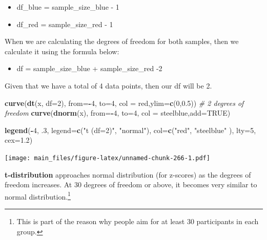 \documentclass[
]{book}
\newenvironment{Shaded}{\begin{snugshade}}{\end{snugshade}}
\newcommand{\AttributeTok}[1]{\textcolor[rgb]{0.13,0.29,0.53}{#1}}
\newcommand{\CommentTok}[1]{\textcolor[rgb]{0.56,0.35,0.01}{\textit{#1}}}
\newcommand{\ConstantTok}[1]{\textcolor[rgb]{0.56,0.35,0.01}{#1}}
\newcommand{\DecValTok}[1]{\textcolor[rgb]{0.00,0.00,0.81}{#1}}
\newcommand{\FloatTok}[1]{\textcolor[rgb]{0.00,0.00,0.81}{#1}}
\newcommand{\FunctionTok}[1]{\textcolor[rgb]{0.13,0.29,0.53}{\textbf{#1}}}
\newcommand{\NormalTok}[1]{#1}
\newcommand{\SpecialCharTok}[1]{\textcolor[rgb]{0.81,0.36,0.00}{\textbf{#1}}}
\newcommand{\StringTok}[1]{\textcolor[rgb]{0.31,0.60,0.02}{#1}}
\providecommand{\tightlist}{%
  \setlength{\itemsep}{0pt}\setlength{\parskip}{0pt}}
\begin{document}
\begin{itemize}
\tightlist
\item
  df\_blue = sample\_size\_blue - 1
\item
  df\_red = sample\_size\_red - 1
\end{itemize}

When we are calculating the degrees of freedom for both samples, then we calculate it using the formula below:

\begin{itemize}
\tightlist
\item
  df = sample\_size\_blue + sample\_size\_red -2
\end{itemize}

Given that we have a total of 4 data points, then our df will be 2.

\begin{Shaded}
\begin{Highlighting}[]
\FunctionTok{curve}\NormalTok{(}\FunctionTok{dt}\NormalTok{(x, }\AttributeTok{df=}\DecValTok{2}\NormalTok{), }\AttributeTok{from=}\SpecialCharTok{{-}}\DecValTok{4}\NormalTok{, }\AttributeTok{to=}\DecValTok{4}\NormalTok{, }\AttributeTok{col =} \StringTok{\textquotesingle{}red\textquotesingle{}}\NormalTok{,}\AttributeTok{ylim=}\FunctionTok{c}\NormalTok{(}\DecValTok{0}\NormalTok{,}\FloatTok{0.5}\NormalTok{)) }\CommentTok{\# 2 degrees of freedom}
\FunctionTok{curve}\NormalTok{(}\FunctionTok{dnorm}\NormalTok{(x), }\AttributeTok{from=}\SpecialCharTok{{-}}\DecValTok{4}\NormalTok{, }\AttributeTok{to=}\DecValTok{4}\NormalTok{, }\AttributeTok{col =} \StringTok{\textquotesingle{}steelblue\textquotesingle{}}\NormalTok{,}\AttributeTok{add=}\ConstantTok{TRUE}\NormalTok{) }

\FunctionTok{legend}\NormalTok{(}\SpecialCharTok{{-}}\DecValTok{4}\NormalTok{, .}\DecValTok{3}\NormalTok{, }\AttributeTok{legend=}\FunctionTok{c}\NormalTok{(}\StringTok{"t (df=2)"}\NormalTok{, }\StringTok{"normal"}\NormalTok{),}
       \AttributeTok{col=}\FunctionTok{c}\NormalTok{(}\StringTok{"red"}\NormalTok{, }\StringTok{"steelblue"}\NormalTok{ ), }\AttributeTok{lty=}\DecValTok{5}\NormalTok{, }\AttributeTok{cex=}\FloatTok{1.2}\NormalTok{)}
\end{Highlighting}
\end{Shaded}

\texttt{[image: main\_files/figure-latex/unnamed-chunk-266-1.pdf]}

\textbf{t-distribution} approaches normal distribution (for z-scores) as the degrees of freedom increases. At 30 degrees of freedom or above, it becomes very similar to normal distribution.\footnote{This is part of the reason why people aim for at least 30 participants in each group.}
\end{document}
